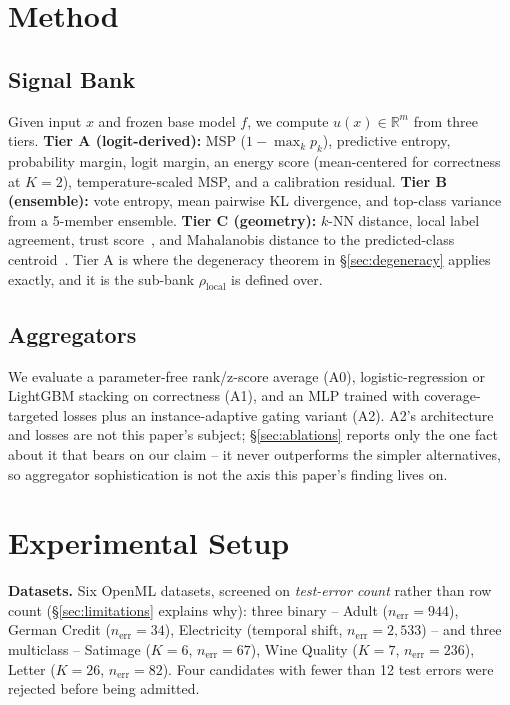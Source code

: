 \documentclass[conference]{IEEEtran}
\newcommand{\rholocal}{\rho_{\mathrm{local}}}
\begin{document}
\section{Method}
\label{sec:method}

\subsection{Signal Bank}
Given input $x$ and frozen base model $f$, we compute $u(x) \in \mathbb{R}^m$ from three tiers. \textbf{Tier A (logit-derived):} MSP ($1{-}\max_k p_k$), predictive entropy, probability margin, logit margin, an energy score (mean-centered for correctness at $K{=}2$), temperature-scaled MSP, and a calibration residual. \textbf{Tier B (ensemble):} vote entropy, mean pairwise KL divergence, and top-class variance from a 5-member ensemble. \textbf{Tier C (geometry):} $k$-NN distance, local label agreement, trust score~\cite{jiang2018trustscore}, and Mahalanobis distance to the predicted-class centroid~\cite{lee2018mahalanobis}. Tier A is where the degeneracy theorem in \S\ref{sec:degeneracy} applies exactly, and it is the sub-bank $\rholocal$ is defined over.

\subsection{Aggregators}
We evaluate a parameter-free rank/z-score average (A0), logistic-regression or LightGBM stacking on correctness (A1), and an MLP trained with coverage-targeted losses plus an instance-adaptive gating variant (A2). A2's architecture and losses are not this paper's subject; \S\ref{sec:ablations} reports only the one fact about it that bears on our claim -- it never outperforms the simpler alternatives, so aggregator sophistication is not the axis this paper's finding lives on.

\section{Experimental Setup}
\label{sec:setup}

\textbf{Datasets.} Six OpenML datasets, screened on \emph{test-error count} rather than row count (\S\ref{sec:limitations} explains why): three binary -- Adult ($n_{\mathrm{err}}{=}944$), German Credit ($n_{\mathrm{err}}{=}34$), Electricity (temporal shift, $n_{\mathrm{err}}{=}2{,}533$) -- and three multiclass -- Satimage ($K{=}6$, $n_{\mathrm{err}}{=}67$), Wine Quality ($K{=}7$, $n_{\mathrm{err}}{=}236$), Letter ($K{=}26$, $n_{\mathrm{err}}{=}82$). Four candidates with fewer than 12 test errors were rejected before being admitted.
\end{document}

